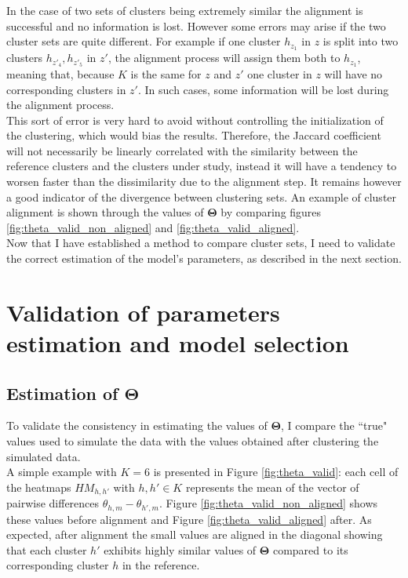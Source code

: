 In the case of two sets of clusters being extremely similar the alignment is successful and no information is lost. However some errors may arise if the two cluster sets are quite different. For example if one cluster $h_{z_1}$ in $z$ is split into two clusters $h_{z'_4},h_{z'_5}$ in $z'$, the alignment process will assign them both to $h_{z_1}$, meaning that, because $K$ is the same for $z$ and $z'$ one cluster in $z$ will have no corresponding clusters in $z'$. In such cases, some information will be lost during the alignment process.\\

This sort of error is very hard to avoid without controlling the initialization of the clustering, which would bias the results. Therefore, the Jaccard coefficient will not necessarily be linearly correlated with the similarity between the reference clusters and the clusters under study, instead it will have a tendency to worsen faster than the dissimilarity due to the alignment step. It remains however a good indicator of the divergence between clustering sets. An example of cluster alignment is shown through the values of $\boldsymbol{\Theta}$ by comparing  figures \ref{fig:theta_valid_non_aligned} and \ref{fig:theta_valid_aligned}.\\

Now that I have established a method to compare cluster sets, I need to validate the correct estimation of the model's parameters, as described in the next section.


\section{Validation of parameters estimation and model selection}
	\subsection{Estimation of $\boldsymbol{\Theta}$}
	To validate the consistency in estimating the values of $\boldsymbol{\Theta}$, I compare the ``true" values used to simulate the data with the values obtained after clustering the simulated data.\\
	
	A simple example with $K=6$ is presented in Figure \ref{fig:theta_valid}: each cell of the heatmaps $HM_{h,h'}$ with $h,h' \in K$ represents the mean of the vector of pairwise differences $\theta_{h,m} - \theta_{h',m}$. Figure \ref{fig:theta_valid_non_aligned} shows these values before alignment and Figure \ref{fig:theta_valid_aligned} after. As expected, after alignment the small values are aligned in the diagonal showing that each cluster $h'$ exhibits highly similar values of $\boldsymbol{\Theta}$ compared to its corresponding cluster $h$ in the reference.\\
	 
